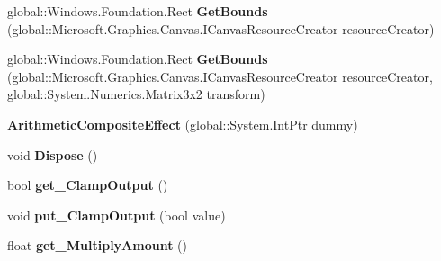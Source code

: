 \begin{DoxyCompactItemize}
global\+::\+Windows.\+Foundation.\+Rect {\bfseries Get\+Bounds} (global\+::\+Microsoft.\+Graphics.\+Canvas.\+I\+Canvas\+Resource\+Creator resource\+Creator)
\item 
\mbox{\label{class_microsoft_1_1_graphics_1_1_canvas_1_1_effects_1_1_arithmetic_composite_effect_ae11051d53e88d2ea9c48b02a05449c08}} 
global\+::\+Windows.\+Foundation.\+Rect {\bfseries Get\+Bounds} (global\+::\+Microsoft.\+Graphics.\+Canvas.\+I\+Canvas\+Resource\+Creator resource\+Creator, global\+::\+System.\+Numerics.\+Matrix3x2 transform)
\item 
\mbox{\label{class_microsoft_1_1_graphics_1_1_canvas_1_1_effects_1_1_arithmetic_composite_effect_a0b741230609e3e96b63205529cafcc0e}} 
{\bfseries Arithmetic\+Composite\+Effect} (global\+::\+System.\+Int\+Ptr dummy)
\item 
\mbox{\label{class_microsoft_1_1_graphics_1_1_canvas_1_1_effects_1_1_arithmetic_composite_effect_a814a3083301ae2542741410c5216199c}} 
void {\bfseries Dispose} ()
\item 
\mbox{\label{class_microsoft_1_1_graphics_1_1_canvas_1_1_effects_1_1_arithmetic_composite_effect_ad7af239149182a318b8d1401cde7cdf1}} 
bool {\bfseries get\+\_\+\+Clamp\+Output} ()
\item 
\mbox{\label{class_microsoft_1_1_graphics_1_1_canvas_1_1_effects_1_1_arithmetic_composite_effect_ac9e62a63352048c2ea53d659c3251f7f}} 
void {\bfseries put\+\_\+\+Clamp\+Output} (bool value)
\item 
\mbox{\label{class_microsoft_1_1_graphics_1_1_canvas_1_1_effects_1_1_arithmetic_composite_effect_abe3d457ef2dfc078a7533da0cd1642f0}} 
float {\bfseries get\+\_\+\+Multiply\+Amount} ()
\item 
\mbox{\label{class_microsoft_1_1_graphics_1_1_canvas_1_1_effects_1_1_arithmetic_composite_effect_ab8a214a8e5d0deb9f48159ba7c2f74b6}} 

\end{DoxyCompactItemize}
